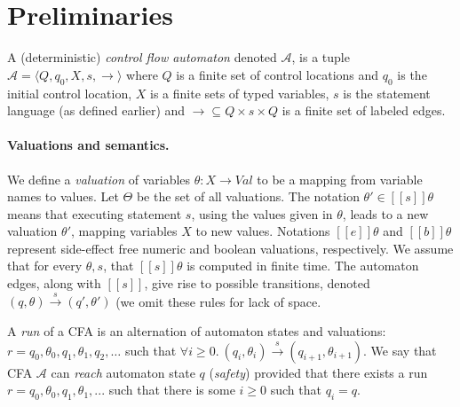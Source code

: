 \newcommand\aut{\mathcal{A}}
\newcommand\sem[1]{[\![ #1 ]\!]}

\newcommand\cfarightarrow[1]{\xrightarrow{#1}}
\newcommand\vln{\theta}
\newcommand\Vlns{\Theta}
\newcommand\op{\red{op}}
\newcommand\Ops{\red{Ops}}
\newcommand\states{S}
\newcommand\labels{L}
\newcommand\trans{R}
\newcommand\exect{\textsf{exec}}
\newcommand\rvs{Y}%
\newcommand\exec[2]{\exect(\vln_{#1},m,\vln_{#2},\rvs)}
\newcommand\execVVM[3]{\exect(\vln_{#1},#3,\vln_{#2},\rvs)}
\newcommand\qv[1]{\langle q_{#1}, \vln_{#1} \rangle}
\newcommand\qtv[1]{\langle q_{#1}, `\vln_{#1} \rangle}

\section{Preliminaries}


\begin{definition}
A (deterministic) \emph{control flow automaton} denoted $\aut$, is a
tuple $\aut = \langle Q, q_0, X, s, \cfarightarrow{\,} \rangle$ where $Q$ is a
finite set of control locations and $q_0$ is the initial control location, $X$
is a finite sets of typed variables, $s$ is the statement language (as defined
earlier) and $\cfarightarrow{\,}\subseteq Q \times s \times Q$ is a finite set
of labeled edges.
\end{definition}

\newcommand\run{r}

\paragraph{Valuations and semantics.}
We define a \emph{valuation} of variables 
$\vln : X \rightarrow \mathit{Val}$ to be a mapping from
variable names to values. Let $\Vlns$ be the set of all valuations.
%
The notation $\vln' \in \sem{s}\vln$ means that executing statement $s$, using
the values given in $\vln$, leads to a new
valuation $\vln'$, mapping variables $X$ to new values. Notations $\sem{e}\vln$ and $\sem{b}\vln$ represent side-effect free numeric and boolean valuations, respectively.
%
We assume that for every $\vln,s$, that $\sem{s}\vln$ is computed in finite time.
%
The automaton edges, along with $\sem{s}$, give rise to possible transitions, denoted
$(q,\vln) \cfarightarrow{s} (q',\vln')$ (we omit these rules for lack of space.

A \emph{run} of a CFA is an alternation of automaton states and
valuations: $\run=q_0,\vln_0,q_1,\vln_1,q_2,\dots$
such that $\forall i \geq0.\ (q_i,\vln_i) \cfarightarrow{s} (q_{i+1},\vln_{i+1})$.
%
We say that CFA $\aut$ can \emph{reach} automaton state $q$ (\emph{safety}) provided that
there exists a run $\run= q_0,\vln_0,q_1,\vln_1,...$ such that there is
some $i \geq 0 $ such that  $q_i=q$.
%
